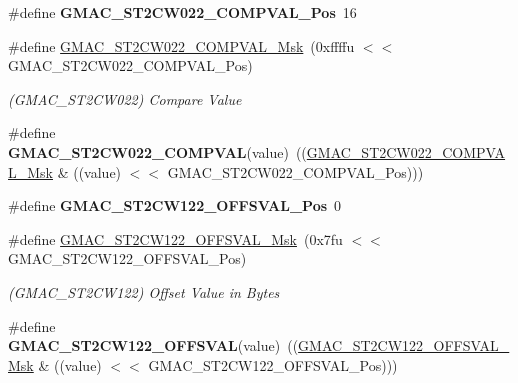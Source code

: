 \begin{DoxyCompactItemize}
\item 
\mbox{\label{group__SAMV71__GMAC_gac90e7cf72adf38ef5050322d13047e0d}} 
\#define {\bfseries G\+M\+A\+C\+\_\+\+S\+T2\+C\+W022\+\_\+\+C\+O\+M\+P\+V\+A\+L\+\_\+\+Pos}~16
\item 
\mbox{\label{group__SAMV71__GMAC_ga4c74c9dc959b2e3f5a7d2ed89e91d6ed}} 
\#define \mbox{\hyperlink{group__SAMV71__GMAC_ga4c74c9dc959b2e3f5a7d2ed89e91d6ed}{G\+M\+A\+C\+\_\+\+S\+T2\+C\+W022\+\_\+\+C\+O\+M\+P\+V\+A\+L\+\_\+\+Msk}}~(0xffffu $<$$<$ G\+M\+A\+C\+\_\+\+S\+T2\+C\+W022\+\_\+\+C\+O\+M\+P\+V\+A\+L\+\_\+\+Pos)
\begin{DoxyCompactList}\small\item\em (G\+M\+A\+C\+\_\+\+S\+T2\+C\+W022) Compare Value \end{DoxyCompactList}\item 
\mbox{\label{group__SAMV71__GMAC_gae31c91f69e668837032c452c9984e29e}} 
\#define {\bfseries G\+M\+A\+C\+\_\+\+S\+T2\+C\+W022\+\_\+\+C\+O\+M\+P\+V\+AL}(value)~((\mbox{\hyperlink{group__SAMV71__GMAC_ga4c74c9dc959b2e3f5a7d2ed89e91d6ed}{G\+M\+A\+C\+\_\+\+S\+T2\+C\+W022\+\_\+\+C\+O\+M\+P\+V\+A\+L\+\_\+\+Msk}} \& ((value) $<$$<$ G\+M\+A\+C\+\_\+\+S\+T2\+C\+W022\+\_\+\+C\+O\+M\+P\+V\+A\+L\+\_\+\+Pos)))
\item 
\mbox{\label{group__SAMV71__GMAC_ga8fa175ffaa53c99c1e6f08d1ea554cea}} 
\#define {\bfseries G\+M\+A\+C\+\_\+\+S\+T2\+C\+W122\+\_\+\+O\+F\+F\+S\+V\+A\+L\+\_\+\+Pos}~0
\item 
\mbox{\label{group__SAMV71__GMAC_ga148c557d20a5ded91f40935560dfc650}} 
\#define \mbox{\hyperlink{group__SAMV71__GMAC_ga148c557d20a5ded91f40935560dfc650}{G\+M\+A\+C\+\_\+\+S\+T2\+C\+W122\+\_\+\+O\+F\+F\+S\+V\+A\+L\+\_\+\+Msk}}~(0x7fu $<$$<$ G\+M\+A\+C\+\_\+\+S\+T2\+C\+W122\+\_\+\+O\+F\+F\+S\+V\+A\+L\+\_\+\+Pos)
\begin{DoxyCompactList}\small\item\em (G\+M\+A\+C\+\_\+\+S\+T2\+C\+W122) Offset Value in Bytes \end{DoxyCompactList}\item 
\mbox{\label{group__SAMV71__GMAC_ga33833cf1147fdf04fac722c2e762d85e}} 
\#define {\bfseries G\+M\+A\+C\+\_\+\+S\+T2\+C\+W122\+\_\+\+O\+F\+F\+S\+V\+AL}(value)~((\mbox{\hyperlink{group__SAMV71__GMAC_ga148c557d20a5ded91f40935560dfc650}{G\+M\+A\+C\+\_\+\+S\+T2\+C\+W122\+\_\+\+O\+F\+F\+S\+V\+A\+L\+\_\+\+Msk}} \& ((value) $<$$<$ G\+M\+A\+C\+\_\+\+S\+T2\+C\+W122\+\_\+\+O\+F\+F\+S\+V\+A\+L\+\_\+\+Pos)))

\end{DoxyCompactItemize}
